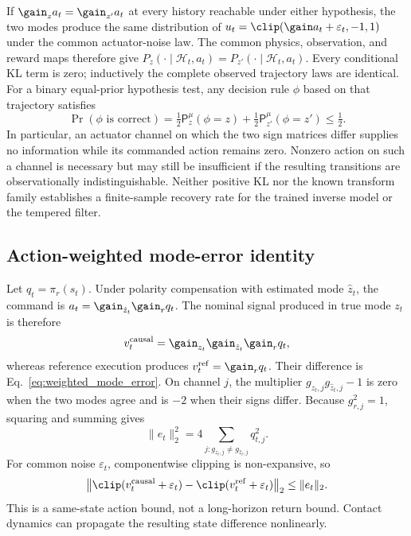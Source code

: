 If $\gain_z a_t=\gain_{z'}a_t$ at every history reachable under either hypothesis, the two modes produce the same distribution of $u_t=\clip(\gain a_t+\varepsilon_t,-1,1)$ under the common actuator-noise law. The common physics, observation, and reward maps therefore give $P_z(\cdot\mid\mathcal H_t,a_t)=P_{z'}(\cdot\mid\mathcal H_t,a_t)$. Every conditional KL term is zero; inductively the complete observed trajectory laws are identical. For a binary equal-prior hypothesis test, any decision rule $\phi$ based on that trajectory satisfies
\begin{equation}
 \Pr(\phi\text{ is correct})
 =\tfrac12\mathsf P_z^{\mu}(\phi=z)
 +\tfrac12\mathsf P_{z'}^{\mu}(\phi=z')\leq\tfrac12.
\end{equation}
In particular, an actuator channel on which the two sign matrices differ supplies no information while its commanded action remains zero. Nonzero action on such a channel is necessary but may still be insufficient if the resulting transitions are observationally indistinguishable. Neither positive KL nor the known transform family establishes a finite-sample recovery rate for the trained inverse model or the tempered filter.

\subsection{Action-weighted mode-error identity}

Let $q_t=\pi_r(s_t)$. Under polarity compensation with estimated mode $\hat z_t$, the command is $a_t=\gain_{\hat z_t}\gain_r q_t$. The nominal signal produced in true mode $z_t$ is therefore
\begin{equation}
 v_t^{\mathrm{causal}}=\gain_{z_t}\gain_{\hat z_t}\gain_r q_t,
\end{equation}
whereas reference execution produces $v_t^{\mathrm{ref}}=\gain_r q_t$. Their difference is Eq.~\eqref{eq:weighted_mode_error}. On channel $j$, the multiplier $g_{z_t,j}g_{\hat z_t,j}-1$ is zero when the two modes agree and is $-2$ when their signs differ. Because $g_{r,j}^2=1$, squaring and summing gives
\begin{equation}
 \|e_t\|_2^2
 =4\sum_{j:g_{z_t,j}\ne g_{\hat z_t,j}}q_{t,j}^2.
\end{equation}
For common noise $\varepsilon_t$, componentwise clipping is non-expansive, so
\begin{equation}
 \left\|\clip(v_t^{\mathrm{causal}}+\varepsilon_t)
 -\clip(v_t^{\mathrm{ref}}+\varepsilon_t)\right\|_2
 \le \|e_t\|_2.
\end{equation}
This is a same-state action bound, not a long-horizon return bound. Contact dynamics can propagate the resulting state difference nonlinearly.


